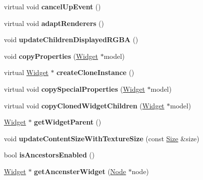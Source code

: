 \begin{DoxyCompactItemize}
virtual void {\bfseries cancel\+Up\+Event} ()
\item 
\mbox{\label{classui_1_1Widget_ad3d2b50ab43fede58010c11e0e25ab97}} 
virtual void {\bfseries adapt\+Renderers} ()
\item 
\mbox{\label{classui_1_1Widget_a688b678d37e87f6c3dc03d2116560e5b}} 
void {\bfseries update\+Children\+Displayed\+R\+G\+BA} ()
\item 
\mbox{\label{classui_1_1Widget_a8b92894d6778cb233b34db2f26714f3b}} 
void {\bfseries copy\+Properties} (\hyperlink{classui_1_1Widget}{Widget} $\ast$model)
\item 
\mbox{\label{classui_1_1Widget_aeb18f12a1c3aa45acbe20fa38f2666d1}} 
virtual \hyperlink{classui_1_1Widget}{Widget} $\ast$ {\bfseries create\+Clone\+Instance} ()
\item 
\mbox{\label{classui_1_1Widget_a46e4a6d664f59a932b55f0d14a02aee8}} 
virtual void {\bfseries copy\+Special\+Properties} (\hyperlink{classui_1_1Widget}{Widget} $\ast$model)
\item 
\mbox{\label{classui_1_1Widget_a75f81a82dbdab1e29fc18313012321d7}} 
virtual void {\bfseries copy\+Cloned\+Widget\+Children} (\hyperlink{classui_1_1Widget}{Widget} $\ast$model)
\item 
\mbox{\label{classui_1_1Widget_af1d27ed3bbce8bb1ba7a6e4b6ab09831}} 
\hyperlink{classui_1_1Widget}{Widget} $\ast$ {\bfseries get\+Widget\+Parent} ()
\item 
\mbox{\label{classui_1_1Widget_ab06443178cbc5802e7cd329bc553332c}} 
void {\bfseries update\+Content\+Size\+With\+Texture\+Size} (const \hyperlink{classSize}{Size} \&size)
\item 
\mbox{\label{classui_1_1Widget_a0b8434ddde4ec9e64f2cc6b5c6fa863e}} 
bool {\bfseries is\+Ancestors\+Enabled} ()
\item 
\mbox{\label{classui_1_1Widget_ad2072dc4ef885033ed31f592b608bd9f}} 
\hyperlink{classui_1_1Widget}{Widget} $\ast$ {\bfseries get\+Ancenster\+Widget} (\hyperlink{classNode}{Node} $\ast$node)

\end{DoxyCompactItemize}
